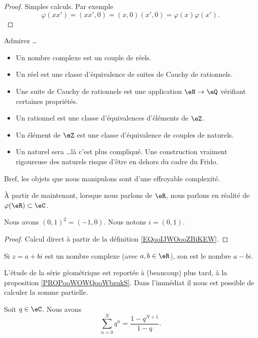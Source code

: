 \begin{proof}
	Simples calculs. Par exemple
	\begin{equation}
		\varphi(xx')=(xx',0)=(x,0)(x',0)=\varphi(x)\varphi(x').
	\end{equation}
\end{proof}

\begin{normaltext}
	Admirez \ldots
	\begin{itemize}
		\item Un nombre complexe est un couple de réels.
		\item Un réel est une classe d'équivalence de suites de Cauchy de rationnels.
		\item Une suite de Cauchy de rationnels est une application \( \eN\to \eQ\) vérifiant certaines propriétés.
		\item Un rationnel est une classe d'équivalences d'éléments de \( \eZ\).
		\item Un élément de \( \eZ\) est une classe d'équivalence de couples de naturels.
		\item Un naturel sera \ldots là c'est plus compliqué. Une construction vraiment rigoureuse des naturels risque d'être en dehors du cadre du Frido.
	\end{itemize}
	Bref, les objets que nous manipulons sont d'une effroyable complexité.
\end{normaltext}

\begin{normaltext}
	À partir de maintenant, lorsque nous parlons de \( \eR\), nous parlons en réalité de \( \varphi(\eR)\subset \eC\).
\end{normaltext}

\begin{lemma}
	Nous avons \( (0,1)^2=(-1,0)\). Nous notons \( i=(0,1)\).
\end{lemma}

\begin{proof}
	Calcul direct à partir de la définition \ref{EQooIJWOooZBiKEW}.
\end{proof}


\begin{definition}      \label{DEFooQDDVooRYDsAJ}
	Si \( z=a+bi\) est un nombre complexe (avec \( a,b\in \eR\)), son  est le nombre \( a-bi\).
\end{definition}

L'étude de la série géométrique est reportée à (beaucoup) plus tard, à la proposition \ref{PROPooWOWQooWbzukS}. Dans l'immédiat il nous est possible de calculer la somme partielle.
\begin{lemma}      \label{LEMooAFSCooWEVlvp}
	Soit \( q\in \eC\). Nous avons
	\begin{equation}
		\sum_{n=0}^Nq^n=\frac{ 1-q^{N+1} }{ 1-q }.
	\end{equation}
\end{lemma}

